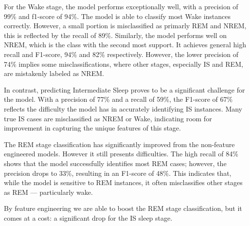 \documentclass{article}
\begin{document}
\begin{multicols}{2}
For the Wake stage, the model performs exceptionally well, with a precision of 99\% and f1-score of 94\%. The model is able to classify most Wake instances correctly. However, a small portion is misclassified as primarly REM and NREM, this is reflected by the recall of 89\%. Similarly, the model performs well on NREM, which is the class with the second most support. It achieves general high recall and F1-score, 94\% and 82\% respectively. However, the lower precision of 74\% implies some misclassifications, where other stages, especially IS and REM, are mistakenly labeled as NREM.

In contrast, predicting Intermediate Sleep proves to be a significant challenge for the model. With a precision of 77\% and a recall of 59\%, the F1-score of 67\% reflects the difficulty the model has in accurately identifying IS instances. Many true IS cases are misclassified as NREM or Wake, indicating room for improvement in capturing the unique features of this stage. 

The REM stage classification has significantly improved from the non-feature engineered models. However it still presents difficulties. The high recall of 84\% shows that the model successfully identifies most REM cases; however, the precision drops to 33\%, resulting in an F1-score of 48\%. This indicates that, while the model is sensitive to REM instances, it often misclassifies other stages as REM — particularly wake.

By feature engineering we are able to boost the REM stage classification, but it comes at a cost: a significant drop for the IS sleep stage.
\end{multicols}
\end{document}
